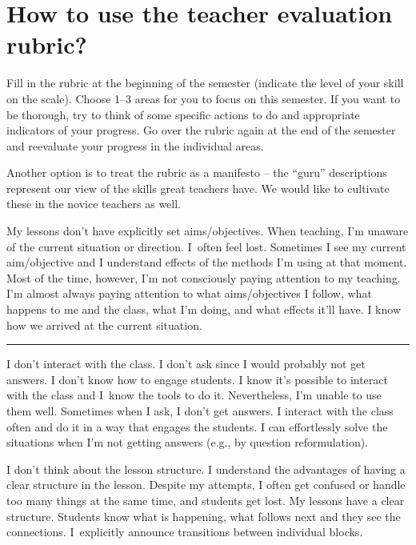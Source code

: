 \section*{How to use the teacher evaluation rubric?}

Fill in the rubric at the beginning of the semester (indicate the level of your skill on the scale). Choose 1--3 areas for you to focus on this semester. If you want to be thorough, try to think of some specific actions to do and appropriate indicators of your progress. Go over the rubric again at the end of the semester and reevaluate your progress in the individual areas.

Another option is to treat the rubric as a manifesto -- the \enquote{guru} descriptions represent our view of the skills great teachers have. We would like to cultivate these in the novice teachers as well.


\newpage
{My lessons don't have explicitly set aims/objectives. When teaching, I'm unaware of the current situation or direction. I~often feel lost.}
{Sometimes I see my current aim/objective and I understand effects of the methods I'm using at that moment. Most of the time, however, I'm not consciously paying attention to my teaching.}
{I'm almost always paying attention to what aims/objectives I follow, what happens to me and the class, what I'm doing, and what effects it'll have. I know how we arrived at the current situation.}

\rule{\textwidth}{0.4pt}
{I don't interact with the class. I don't ask since I would probably not get answers. I don't know how to engage students.}
{I know it's possible to interact with the class and I~know the tools to do it. Nevertheless, I'm unable to use them well. Sometimes when I ask, I don't get answers.}
{I interact with the class often and do it in a way that engages the students. I can effortlessly solve the situations when I'm not getting answers (e.g., by question reformulation).}

\newpage
{}
{I don't think about the lesson structure.}
{I understand the advantages of having a clear structure in the lesson. Despite my attempts, I often get confused or handle too many things at the same time, and students get lost.}
{My lessons have a clear structure. Students know what is happening, what follows next and they see the connections. I~explicitly announce transitions between individual blocks.}


